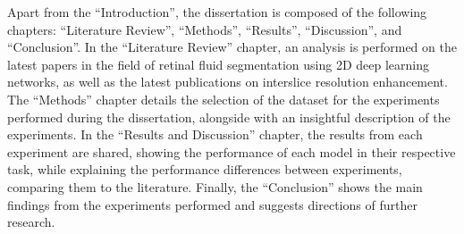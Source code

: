 Apart from the ``Introduction'', the dissertation is composed of the following chapters: ``Literature Review'', ``Methods'', ``Results'', ``Discussion'', and ``Conclusion''. In the ``Literature Review'' chapter, an analysis is performed on the latest papers in the field of retinal fluid segmentation using 2D deep learning networks, as well as the latest publications on interslice resolution enhancement. The ``Methods'' chapter details the selection of the dataset for the experiments performed during the dissertation, alongside with an insightful description of the experiments. In the ``Results and Discussion'' chapter, the results from each experiment are shared, showing the performance of each model in their respective task, while explaining the performance differences between experiments, comparing them to the literature. Finally, the ``Conclusion'' shows the main findings from the experiments performed and suggests directions of further research.
